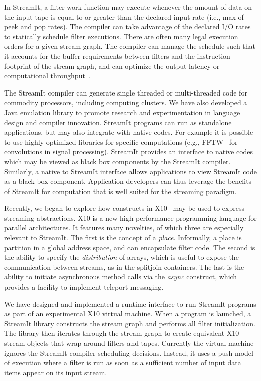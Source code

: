 \vspace{-11pt}

In StreamIt, a filter work function may execute whenever the amount of
data on the input tape is equal to or greater than the declared input
rate (i.e., max of peek and pop rates). The compiler can take
advantage of the declared I/O rates to statically
schedule filter executions. There are often many legal execution
orders for a given stream graph. The compiler can manage the schedule
such that it accounts for the buffer requirements between filters and
the instruction footprint of the stream graph, and can optimize the
output latency or computational throughput~\cite{karczma03lctes,
sermulins05lctes}.

The StreamIt compiler can generate single threaded or multi-threaded
code for commodity processors, including computing clusters. We have
also developed a {\sc Java} emulation library to promote research and
experimentation in language design and compiler innovation.  StreamIt
programs can run as standalone applications, but may also integrate
with native codes. For example it is possible to use highly optimized
libraries for specific computations (e.g., FFTW~\cite{frigo98fftw} for
convolutions in signal processing). StreamIt provides an interface to
native codes which may be viewed as black box components by the
StreamIt compiler. Similarly, a native to StreamIt interface allows
applications to view StreamIt code as a black box
component. Application developers can thus leverage the benefits of
StreamIt for computation that is well suited for the streaming
paradigm.

Recently, we began to explore how constructs in X10~\cite{x10} may be
used to express streaming abstractions. X10 is a new high performance
programming language for parallel architectures. It features many
novelties, of which three are especially relevant to StreamIt. The
first is the concept of a {\it place}. Informally, a place is
partition in a global address space, and can encapsulate filter
code. The second is the ability to specify the {\it distribution} of
arrays, which is useful to expose the communication between streams,
as in the splitjoin containers. The last is the ability to initiate
asynchronous method calls via the {\it async} construct, which
provides a facility to implement teleport messaging.

We have designed and implemented a runtime interface to run StreamIt
programs as part of an experimental X10 virtual machine. When a
program is launched, a StreamIt library constructs the stream graph
and performs all filter initialization. The library then iterates
through the stream graph to create equivalent X10 stream objects that
wrap around filters and tapes. Currently the virtual machine ignores
the StreamIt compiler scheduling decisions. Instead, it uses a push
model of execution where a filter is run as soon as a sufficient
number of input data items appear on its input stream.


